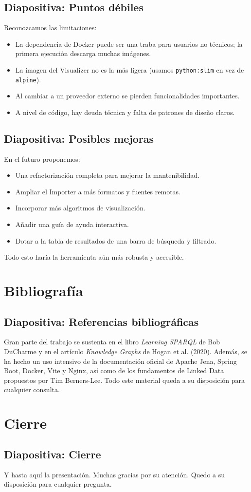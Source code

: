 \documentclass{article}
\begin{document}
\subsection*{Diapositiva: Puntos débiles}
Reconozcamos las limitaciones:
\begin{itemize}
    \item La dependencia de Docker puede ser una traba para usuarios no técnicos; la primera ejecución descarga muchas imágenes.
    \item La imagen del Visualizer no es la más ligera (usamos \texttt{python:slim} en vez de \texttt{alpine}).
    \item Al cambiar a un proveedor externo se pierden funcionalidades importantes.
    \item A nivel de código, hay deuda técnica y falta de patrones de diseño claros.
\end{itemize}

\subsection*{Diapositiva: Posibles mejoras}
En el futuro proponemos:
\begin{itemize}
    \item Una refactorización completa para mejorar la mantenibilidad.
    \item Ampliar el Importer a más formatos y fuentes remotas.
    \item Incorporar más algoritmos de visualización.
    \item Añadir una guía de ayuda interactiva.
    \item Dotar a la tabla de resultados de una barra de búsqueda y filtrado.
\end{itemize}
Todo esto haría la herramienta aún más robusta y accesible.


\section*{Bibliografía}
\subsection*{Diapositiva: Referencias bibliográficas}
Gran parte del trabajo se sustenta en el libro \textit{Learning SPARQL} de Bob DuCharme y en el artículo \textit{Knowledge Graphs} de Hogan et al. (2020). Además, se ha hecho un uso intensivo de la documentación oficial de Apache Jena, Spring Boot, Docker, Vite y Nginx, así como de los fundamentos de Linked Data propuestos por Tim Berners-Lee. Todo este material queda a su disposición para cualquier consulta.

\section*{Cierre}

\subsection*{Diapositiva: Cierre}
Y hasta aquí la presentación. Muchas gracias por su atención. Quedo a su disposición para cualquier pregunta.
\end{document}
